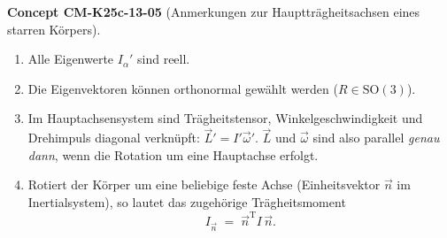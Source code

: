 \documentclass[10pt, letterpaper]{article}
\newcommand{\CustomHeading}[3]{%
  \par\medskip\noindent%
  \textbf{#1 #2} \textnormal{(#3)}.\enskip%
}
\newenvironment{CONC}[2]{\CustomHeading{Concept}{#1}{#2}}{}
\begin{document}
\begin{CONC}{CM-K25c-13-05}{Anmerkungen zur Hauptträgheitsachsen eines starren Körpers}
\begin{enumerate}
  \item Alle Eigenwerte $I_\alpha'$ sind reell.
  \item Die Eigenvektoren können orthonormal gewählt werden
        ($R\in\mathrm{SO}(3)$).
  \item Im Hauptachsensystem sind Trägheits­tensor, Winkelgeschwindigkeit
        und Drehimpuls diagonal verknüpft:
        $\vec L' = I' \vec\omega'$.
        $\vec L$ und $\vec\omega$ sind also parallel
        \emph{genau dann},
        wenn die Rotation um eine Hauptachse erfolgt.
  \item Rotiert der Körper um eine beliebige feste Achse
        (Einheitsvektor $\vec n$ im Inertial­system),
        so lautet das zugehörige Trägheitsmoment
        \[
          I_{\vec n} \;=\;
          \vec n^{\mathrm T} I\,\vec n .
        \]
\end{enumerate}
\end{CONC}
\end{document}
